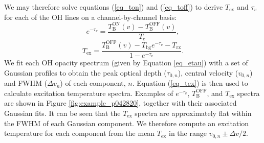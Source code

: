 \documentclass[preprint]{emulateapj}
\begin{document}
We may therefore solve equations (\ref{eq_ton}) and (\ref{eq_toff}) to derive $T_\mathrm{ex}$ and $\tau_{v}$ for each of the OH lines on a channel-by-channel basis:
\begin{equation}
e^{-\tau_{v}} = \frac{T_\mathrm{B}^\mathrm{ON}(v) - T_\mathrm{B}^\mathrm{OFF}(v)}{T_\mathrm{c}},
\label{eq_etau} 
\end{equation}
\begin{equation}
T_\mathrm{ex} = \frac{T_\mathrm{B}^\mathrm{OFF}(v)-T_\mathrm{bg}e^{-\tau_{v}} - T_\mathrm{rx}}{1-e^{-\tau_{v}}}.
\label{eq_tex}
\end{equation}
\noindent %
We fit each OH opacity spectrum (given by Equation \ref{eq_etau}) with a set of Gaussian profiles %
to obtain the peak optical depth ($\tau_{0,n}$), central velocity ($v_{0,n}$) and FWHM ($\Delta v_{n}$) of each component, $n$. %
Equation (\ref{eq_tex}) is then used to calculate excitation temperature spectra. Examples of $e^{-\tau_{v}}$, $T_\mathrm{B}^\mathrm{OFF}$, and $T_\mathrm{ex}$ spectra are shown in Figure \ref{fig:example_p042820}, together with their associated Gaussian fits. It can be seen that the $T_\mathrm{ex}$ spectra are approximately flat within the FWHM of each Gaussian component. %
We therefore compute an excitation temperature for each component from the mean $T_\mathrm{ex}$ in the range $v_{0,n} \pm \Delta v/2$. %
\end{document}

